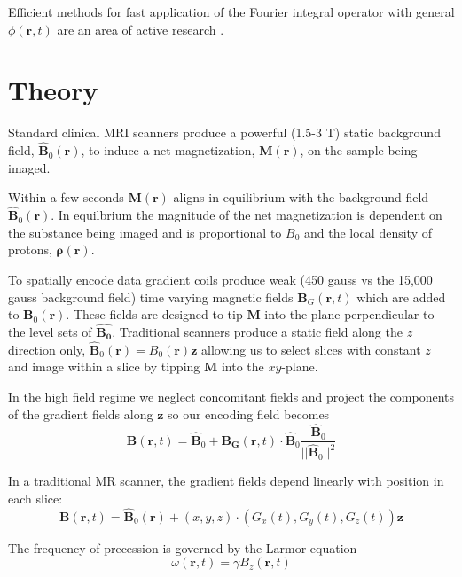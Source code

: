 \documentclass[11pt]{amsart}
\theoremstyle{remark}
\begin{document}
Efficient methods for fast application of the Fourier integral operator with general $\phi(\mathbf{r},t)$ are an area of active research \cite{Cand2006}. 


\section{Theory}

Standard clinical MRI scanners produce a powerful (1.5-3 T) static background field, $\mathbf{\hat{B}}_0(\mathbf{r})$,
to induce a net magnetization, $\mathbf{M(\mathbf{r})}$, on the sample being imaged.

Within a few seconds $\mathbf{M}(\mathbf{r})$ aligns in equilibrium with
the background field $\mathbf{\hat{B}}_0(\mathbf{r})$. In equilbrium the
magnitude of the net magnetization is dependent on the substance being
imaged and is proportional to $B_0$ and the local density of protons, $\mathbf{\rho}(\mathbf{r})$.


To spatially encode data gradient coils produce weak (450 gauss vs the
15,000 gauss background field) time varying magnetic fields
$\mathbf{B}_G(\mathbf{r},t)$ which are added to
$\mathbf{B}_0(\mathbf{r})$. These fields are designed to tip
$\mathbf{M}$ into the plane perpendicular to the level sets of
$\mathbf{\hat{B_0}}$. Traditional scanners produce a static field along
the $z$ direction only, $\mathbf{\hat{B}}_0(\mathbf{r}) =
B_0(\mathbf{r})\mathbf{z}$ allowing us to select slices with
constant $z$ and image within a slice by tipping
$\mathbf{M}$ into the $xy$-plane.


In the high field regime \cite{Kelso2009} we neglect concomitant fields and project the components of the gradient fields along $\mathbf{z}$ so our encoding field becomes
\begin{equation}
\mathbf{B}(\mathbf{r},t) = \mathbf{\hat{B}}_0 + \mathbf{B_G}(\mathbf{r},t)\cdot \mathbf{\hat{B}}_0 \frac{\mathbf{\hat{B}}_0}{||\mathbf{\hat{B}}_0||^2}
\end{equation}


In a traditional MR scanner, the gradient fields depend linearly with position in each slice:
\begin{equation}
\mathbf{B}(\mathbf{r},t) = \mathbf{\hat{B}}_0(\mathbf{r}) + (x,y,z)\cdot(G_x(t),G_y(t),G_z(t))\mathbf{z}
\end{equation}


The frequency of precession is governed by the Larmor equation
\begin{equation}
\omega(\mathbf{r},t) = \gamma B_z(\mathbf{r},t)
\end{equation}
\end{document}

